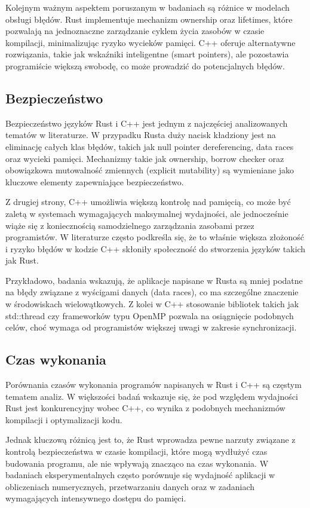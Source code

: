 Kolejnym ważnym aspektem poruszanym w badaniach są różnice w modelach obsługi błędów. Rust implementuje mechanizm ownership oraz lifetimes, które pozwalają na jednoznaczne zarządzanie cyklem życia zasobów w czasie kompilacji, minimalizując ryzyko wycieków pamięci. C++ oferuje alternatywne rozwiązania, takie jak wskaźniki inteligentne (smart pointers), ale pozostawia programiście większą swobodę, co może prowadzić do potencjalnych błędów. \cite{RustDifferences, RustDifferences1}

\subsection{Bezpieczeństwo}
Bezpieczeństwo języków Rust i C++ jest jednym z najczęściej analizowanych tematów w literaturze. W przypadku Rusta duży nacisk kładziony jest na eliminację całych klas błędów, takich jak null pointer dereferencing, data races oraz wycieki pamięci. Mechanizmy takie jak ownership, borrow checker oraz obowiązkowa mutowalność zmiennych (explicit mutability) są wymieniane jako kluczowe elementy zapewniające bezpieczeństwo.

Z drugiej strony, C++ umożliwia większą kontrolę nad pamięcią, co może być zaletą w systemach wymagających maksymalnej wydajności, ale jednocześnie wiąże się z koniecznością samodzielnego zarządzania zasobami przez programistów. W literaturze często podkreśla się, że to właśnie większa złożoność i ryzyko błędów w kodzie C++ skłoniły społeczność do stworzenia języków takich jak Rust.

Przykładowo, badania wskazują, że aplikacje napisane w Rusta są mniej podatne na błędy związane z wyścigami danych (data races), co ma szczególne znaczenie w środowiskach wielowątkowych. Z kolei w C++ stosowanie bibliotek takich jak std::thread czy frameworków typu OpenMP pozwala na osiągnięcie podobnych celów, choć wymaga od programistów większej uwagi w zakresie synchronizacji. \cite{RustSafety1, RustSafety2, RustSafety3}

\subsection{Czas wykonania}
Porównania czasów wykonania programów napisanych w Rust i C++ są częstym tematem analiz. W większości badań wskazuje się, że pod względem wydajności Rust jest konkurencyjny wobec C++, co wynika z podobnych mechanizmów kompilacji i optymalizacji kodu.

Jednak kluczową różnicą jest to, że Rust wprowadza pewne narzuty związane z kontrolą bezpieczeństwa w czasie kompilacji, które mogą wydłużyć czas budowania programu, ale nie wpływają znacząco na czas wykonania. W badaniach eksperymentalnych często porównuje się wydajność aplikacji w obliczeniach numerycznych, przetwarzaniu danych oraz w zadaniach wymagających intensywnego dostępu do pamięci.

